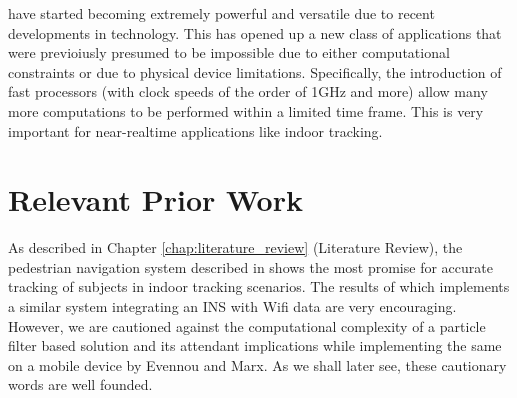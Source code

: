\documentclass[10pt,journal,letterpaper,compsoc]{IEEEtran}
\begin{document}
% 
% 
% 
% 
 have started becoming extremely powerful and
versatile due to recent developments in technology. This has opened up a new
class of applications that were previoiusly presumed to be impossible due to
either computational constraints or due to physical device limitations.
Specifically, the introduction of fast processors (with clock speeds of the 
order of 1GHz and more) allow many more computations to be performed within 
a limited time frame. This is very important for near-realtime applications 
like indoor tracking. 



 


\section{Relevant Prior Work}
As described in Chapter \ref{chap:literature_review} (Literature Review),
the pedestrian navigation system described in \cite{Wang} 
shows the most promise for accurate tracking of subjects in indoor tracking scenarios. 
The results of \cite{Evennou} which implements a similar system integrating an INS 
with Wifi data are very encouraging. However, we are cautioned 
against the computational complexity of a particle filter based solution and its attendant
implications while implementing the same on a mobile device by Evennou and Marx\cite{Evennou}. As we shall later
see, these cautionary words are well founded.
\end{document}
